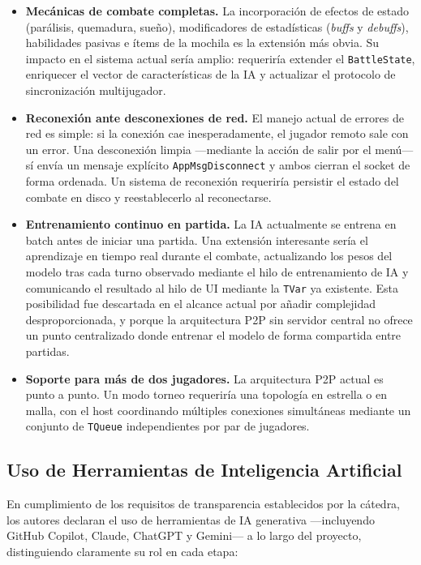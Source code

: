 \begin{itemize}
    \item \textbf{Mecánicas de combate completas.} La incorporación de efectos de estado (parálisis, quemadura, sueño), modificadores de estadísticas (\textit{buffs} y \textit{debuffs}), habilidades pasivas e ítems de la mochila es la extensión más obvia. Su impacto en el sistema actual sería amplio: requeriría extender el \texttt{BattleState}, enriquecer el vector de características de la IA y actualizar el protocolo de sincronización multijugador.
    \item \textbf{Reconexión ante desconexiones de red.} El manejo actual de errores de red es simple: si la conexión cae inesperadamente, el jugador remoto sale con un error. Una desconexión limpia —mediante la acción de salir por el menú— sí envía un mensaje explícito \texttt{AppMsgDisconnect} y ambos cierran el socket de forma ordenada. Un sistema de reconexión requeriría persistir el estado del combate en disco y reestablecerlo al reconectarse.
    \item \textbf{Entrenamiento continuo en partida.} La IA actualmente se entrena en batch antes de iniciar una partida. Una extensión interesante sería el aprendizaje en tiempo real durante el combate, actualizando los pesos del modelo tras cada turno observado mediante el hilo de entrenamiento de IA y comunicando el resultado al hilo de UI mediante la \texttt{TVar} ya existente. Esta posibilidad fue descartada en el alcance actual por añadir complejidad desproporcionada, y porque la arquitectura P2P sin servidor central no ofrece un punto centralizado donde entrenar el modelo de forma compartida entre partidas.
    \item \textbf{Soporte para más de dos jugadores.} La arquitectura P2P actual es punto a punto. Un modo torneo requeriría una topología en estrella o en malla, con el host coordinando múltiples conexiones simultáneas mediante un conjunto de \texttt{TQueue} independientes por par de jugadores.
\end{itemize}

\subsection{Uso de Herramientas de Inteligencia Artificial}

En cumplimiento de los requisitos de transparencia establecidos por la cátedra, los autores declaran el uso de herramientas de IA generativa —incluyendo GitHub Copilot, Claude, ChatGPT y Gemini— a lo largo del proyecto, distinguiendo claramente su rol en cada etapa:

